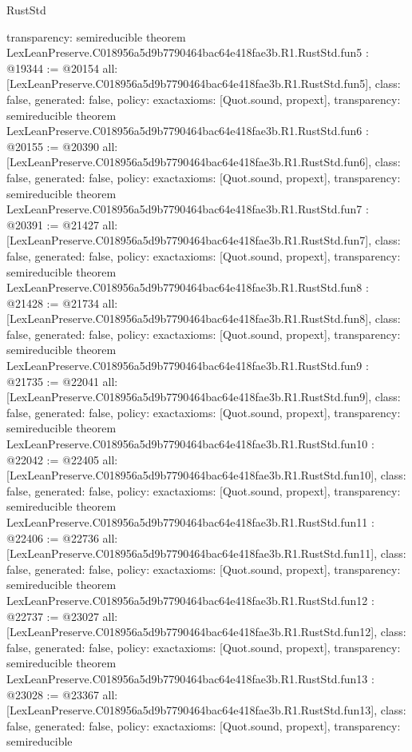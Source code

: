 \begin{lexlean}{RustStd}
\begin{coremodule}
{  transparency: semireducible
}
theorem LexLeanPreserve.C018956a5d9b7790464bac64e418fae3b.R1.RustStd.fun5 : @19344 := @20154 {
  all: [LexLeanPreserve.C018956a5d9b7790464bac64e418fae3b.R1.RustStd.fun5],
  class: false,
  generated: false,
  policy: exact{axioms: [Quot.sound, propext]},
  transparency: semireducible
}
theorem LexLeanPreserve.C018956a5d9b7790464bac64e418fae3b.R1.RustStd.fun6 : @20155 := @20390 {
  all: [LexLeanPreserve.C018956a5d9b7790464bac64e418fae3b.R1.RustStd.fun6],
  class: false,
  generated: false,
  policy: exact{axioms: [Quot.sound, propext]},
  transparency: semireducible
}
theorem LexLeanPreserve.C018956a5d9b7790464bac64e418fae3b.R1.RustStd.fun7 : @20391 := @21427 {
  all: [LexLeanPreserve.C018956a5d9b7790464bac64e418fae3b.R1.RustStd.fun7],
  class: false,
  generated: false,
  policy: exact{axioms: [Quot.sound, propext]},
  transparency: semireducible
}
theorem LexLeanPreserve.C018956a5d9b7790464bac64e418fae3b.R1.RustStd.fun8 : @21428 := @21734 {
  all: [LexLeanPreserve.C018956a5d9b7790464bac64e418fae3b.R1.RustStd.fun8],
  class: false,
  generated: false,
  policy: exact{axioms: [Quot.sound, propext]},
  transparency: semireducible
}
theorem LexLeanPreserve.C018956a5d9b7790464bac64e418fae3b.R1.RustStd.fun9 : @21735 := @22041 {
  all: [LexLeanPreserve.C018956a5d9b7790464bac64e418fae3b.R1.RustStd.fun9],
  class: false,
  generated: false,
  policy: exact{axioms: [Quot.sound, propext]},
  transparency: semireducible
}
theorem LexLeanPreserve.C018956a5d9b7790464bac64e418fae3b.R1.RustStd.fun10 : @22042 := @22405 {
  all: [LexLeanPreserve.C018956a5d9b7790464bac64e418fae3b.R1.RustStd.fun10],
  class: false,
  generated: false,
  policy: exact{axioms: [Quot.sound, propext]},
  transparency: semireducible
}
theorem LexLeanPreserve.C018956a5d9b7790464bac64e418fae3b.R1.RustStd.fun11 : @22406 := @22736 {
  all: [LexLeanPreserve.C018956a5d9b7790464bac64e418fae3b.R1.RustStd.fun11],
  class: false,
  generated: false,
  policy: exact{axioms: [Quot.sound, propext]},
  transparency: semireducible
}
theorem LexLeanPreserve.C018956a5d9b7790464bac64e418fae3b.R1.RustStd.fun12 : @22737 := @23027 {
  all: [LexLeanPreserve.C018956a5d9b7790464bac64e418fae3b.R1.RustStd.fun12],
  class: false,
  generated: false,
  policy: exact{axioms: [Quot.sound, propext]},
  transparency: semireducible
}
theorem LexLeanPreserve.C018956a5d9b7790464bac64e418fae3b.R1.RustStd.fun13 : @23028 := @23367 {
  all: [LexLeanPreserve.C018956a5d9b7790464bac64e418fae3b.R1.RustStd.fun13],
  class: false,
  generated: false,
  policy: exact{axioms: [Quot.sound, propext]},
  transparency: semireducible
}
\end{coremodule}
\end{lexlean}
